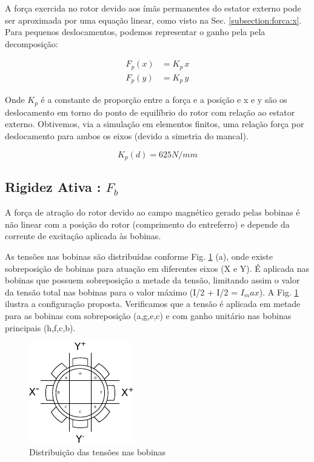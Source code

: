 A força exercida no rotor devido aos ímãs permanentes do estator externo pode ser aproximada por uma equação linear, como visto na Sec. \ref{subsection:forca:x}. Para pequenos deslocamentos, podemos representar o ganho pela pela decomposição:

\begin{align}
	F_p(x) &= K_p \, x \\
	F_p(y) &= K_p \, y 
\end{align}

Onde $K_p$ é a constante de proporção entre a força e a posição e x e y são os deslocamento em torno do ponto de equilíbrio do rotor com relação ao estator externo. Obtivemos, via a simulação em elementos finitos, uma relação força por deslocamento para ambos os eixos (devido a simetria do mancal). 

\begin{equation}
 K_p(d) = 625 N/mm 
\end{equation}

\subsection{Rigidez Ativa : $F_b$}

A força de atração do rotor devido ao campo magnético gerado pelas bobinas é não linear com a posição do rotor (comprimento do entreferro) e depende da corrente de excitação aplicada às bobinas.  

As tensões nas bobinas são distribuídas conforme Fig. \ref{fig:blocos:tensao:bobinas:x:y} (a), onde existe sobreposição de bobinas para atuação em diferentes eixos (X e Y). É aplicada nas bobinas que possuem sobreposição a metade da tensão, limitando assim o valor da tensão total nas bobinas para o valor máximo (I/2 + I/2 = $I_max$). A Fig. \ref{fig:blocos:tensao:bobinas:x:y} ilustra a configuração proposta. Verificamos que a tensão é aplicada em metade para as bobinas com sobreposição (a,g,e,c) e com ganho unitário nas bobinas principais (h,f,c,b). 

\begin{figure}[th]
\centering
\includegraphics[width=0.7\linewidth]{./Figs/Modelagem/ativo-atuadores-conexao}
\caption{Distribuição das tensões nas bobinas}
\label{fig:blocos:tensao:bobinas:x:y}
\end{figure}

